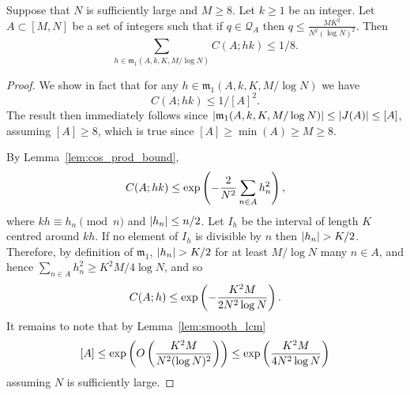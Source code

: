 \begin{lemma}\label{lem:minor1_bound}
Suppose that $N$ is sufficiently large and $M\geq 8$. Let $k\geq 1$ be an integer. Let $A\subset [M,N]$ be a set of integers such that if $q\in\mathcal{Q}_A$ then $q\leq \frac{MK^2}{N^2(\log N)^2}$. Then
\[\sum_{h\in \mathfrak{m}_1(A,k,K,M/\log N)} C(A;hk)\leq 1/8.\]
\end{lemma}
\begin{proof}
We show in fact that for any $h\in \mathfrak{m}_1(A,k,K,M/\log N)$ we have
\[C(A;hk)\leq 1/[A]^2.\]
The result then immediately follows since $\left\lvert \mathfrak{m}_1(A,k,K,M/\log N)\right\rvert\leq \left\lvert J(A)\right\rvert\leq [A]$, assuming $[A]\geq 8$, which is true since $[A]\geq \min(A)\geq M\geq 8$.

By Lemma~\ref{lem:cos_prod_bound},
\[C(A;hk)\leq \exp\left( -\frac{2}{N^2}\sum_{n\in A}h_n^2\right),\]
where $kh\equiv h_n\pmod{n}$ and $\left\lvert h_n\right\rvert\leq n/2$. Let $I_h$ be the interval of length $K$ centred around $kh$. If no element of $I_h$ is divisible by $n$ then $\left\lvert h_n\right\rvert>K/2$. Therefore, by definition of $\mathfrak{m}_1$, $\left\lvert h_n\right\rvert>K/2$ for at least $M/\log N$ many $n\in A$, and hence $\sum_{n\in A}h_n^2\geq K^2M/4\log N$, and so
\[C(A;h)\leq \exp\left( -\frac{K^2M}{2N^2\log N}\right).\]
It remains to note that by Lemma~\ref{lem:smooth_lcm}
\[[A]\leq \exp\left( O\left( \frac{K^2M}{N^2(\log N)^2}\right)\right)\leq \exp\left( \frac{K^2M}{4N^2\log N}\right)\]
assuming $N$ is sufficiently large.
\end{proof}


